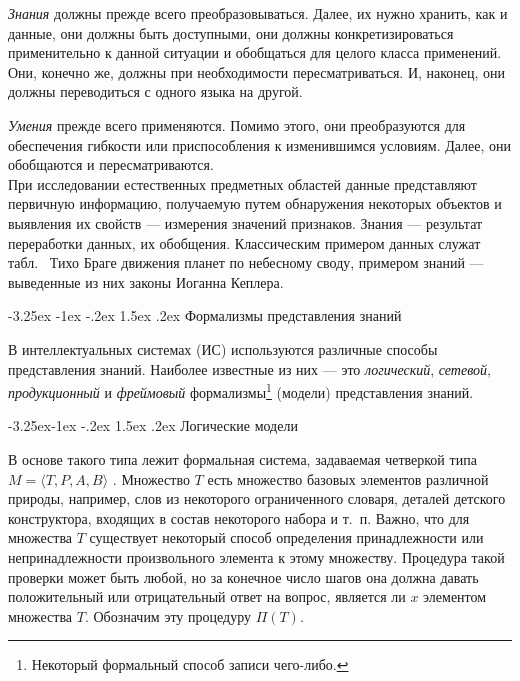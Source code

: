 \documentclass[12pt, openany, twoside]{book} %
\makeatletter
\renewcommand\section{\@startsection {section}{1}{\z@}%
                                   {-3.25ex \@plus -1ex \@minus -.2ex}%
                                   {1.5ex \@plus.2ex}%
                                   {\normalfont\large\bfseries}}
\renewcommand\subsection{\@startsection{subsection}{2}{\z@}%
                                     {-3.25ex\@plus -1ex \@minus -.2ex}%
                                     {1.5ex \@plus .2ex}%
                                     {\normalfont\normalsize\bfseries}}
\makeatother
\begin{document}
    {\em Знания} должны прежде всего преобразовываться. Далее, их нужно хранить, как и данные, они должны быть доступными, они должны конкретизироваться применительно к данной ситуации и обобщаться для целого класса применений. Они, конечно же, должны при необходимости пересматриваться. И, наконец, они должны переводиться с одного языка на другой.

    {\em Умения} прежде всего применяются. Помимо этого, они преобразуются для обеспечения гибкости или приспособления к изменившимся условиям. Далее, они обобщаются и пересматриваются.\\[1ex]

При исследовании естественных предметных областей данные представляют первичную информацию, получаемую путем обнаружения некоторых объектов и выявления их свойств --- измерения значений признаков. Знания --- результат переработки данных, их обобщения. Классическим примером данных служат табл.~ Тихо Браге движения планет по небесному своду, примером знаний --- выведенные из них законы Иоганна Кеплера.

\section{Формализмы представления знаний}
\label{sec:knowlege_repr}


В интеллектуальных системах (ИС) используются различные способы представления знаний. Наиболее известные из них --- это {\em логический}, {\em сетевой}, {\em продукционный} и {\em фреймовый} формализмы\footnote{Некоторый формальный способ записи чего-либо.} (модели) представления знаний.

\subsection{Логические модели}

 В основе такого типа лежит формальная система, задаваемая четверкой типа $M=\langle T, P, A, B\rangle$ \cite{AIDictionary}. Множество $T$ есть множество базовых элементов различной природы, например, слов из некоторого ограниченного словаря, деталей детского конструктора, входящих в состав некоторого набора и т.~п. Важно, что для множества $T$ существует некоторый способ определения принадлежности или непринадлежности произвольного элемента к этому множеству. Процедура такой проверки может быть любой, но за конечное число шагов она должна давать положительный или отрицательный ответ на вопрос, является ли $x$ элементом множества $T$. Обозначим эту процедуру $\Pi(T)$.
\end{document}
